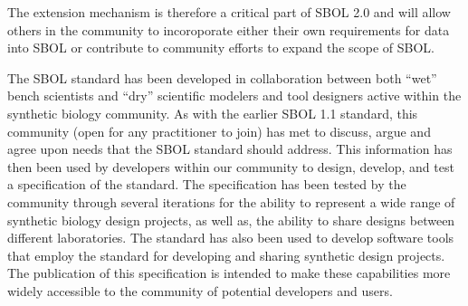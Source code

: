 The extension mechanism is therefore a critical part of SBOL 2.0 and will allow others in the community to incoroporate either their own requirements for data into SBOL or contribute to community efforts to expand the scope of SBOL.


The SBOL standard has been developed in collaboration between both ``wet'' bench scientists and ``dry'' scientific modelers and tool designers active within the synthetic biology community. 
As with the earlier SBOL 1.1 standard, this community (open for any practitioner to join) has met to discuss, argue and agree upon needs that the SBOL standard should address. 
This information has then been used by developers within our community to design, develop, and test a specification of the standard. The specification has been tested by the community through several iterations for the ability to represent a wide range of synthetic biology design projects, as well as, the ability to share designs between different laboratories. 
The standard has also been used to develop software tools that employ the standard for developing and sharing synthetic design projects. 
The publication of this specification is intended to make these capabilities more widely accessible to the community of potential developers and users.